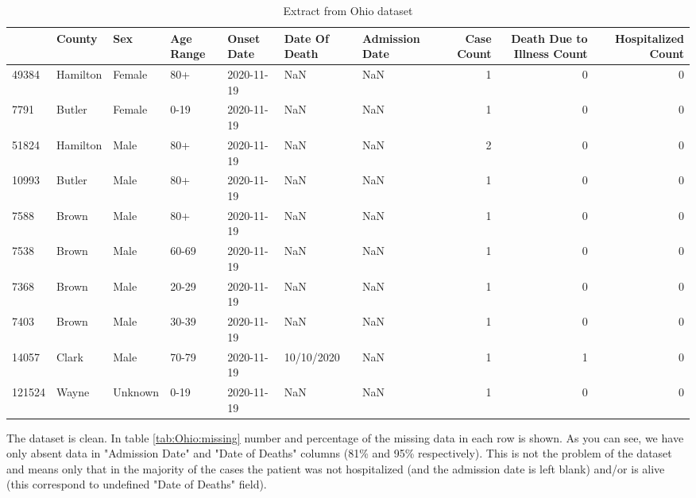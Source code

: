 \documentclass[conference]{IEEEtran}
\begin{document}
\begin{table}
  \tiny
  \centering
  \begin{tabular}{lllllllrrr}
\toprule
{} &    County &      Sex & Age Range & Onset Date & Date Of Death & Admission Date &  Case Count &  Death Due to Illness Count &  Hospitalized Count \\
\midrule
49384  &  Hamilton &   Female &       80+ & 2020-11-19 &           NaN &            NaN &           1 &                           0 &                   0 \\
7791   &    Butler &   Female &      0-19 & 2020-11-19 &           NaN &            NaN &           1 &                           0 &                   0 \\
51824  &  Hamilton &     Male &       80+ & 2020-11-19 &           NaN &            NaN &           2 &                           0 &                   0 \\
10993  &    Butler &     Male &       80+ & 2020-11-19 &           NaN &            NaN &           1 &                           0 &                   0 \\
7588   &     Brown &     Male &       80+ & 2020-11-19 &           NaN &            NaN &           1 &                           0 &                   0 \\
7538   &     Brown &     Male &     60-69 & 2020-11-19 &           NaN &            NaN &           1 &                           0 &                   0 \\
7368   &     Brown &     Male &     20-29 & 2020-11-19 &           NaN &            NaN &           1 &                           0 &                   0 \\
7403   &     Brown &     Male &     30-39 & 2020-11-19 &           NaN &            NaN &           1 &                           0 &                   0 \\
14057  &     Clark &     Male &     70-79 & 2020-11-19 &    10/10/2020 &            NaN &           1 &                           1 &                   0 \\
121524 &     Wayne &  Unknown &      0-19 & 2020-11-19 &           NaN &            NaN &           1 &                           0 &                   0 \\
\bottomrule
\end{tabular}
\caption{Extract from Ohio dataset}
\label{tab:OhioDS}
\end{table}

The dataset is clean. In table \ref{tab:Ohio:missing} number and percentage of the missing data in each row is shown. As you can see, we have only absent data in "Admission Date" and "Date of Deaths" columns (81\% and 95\% respectively). This is not the problem of the dataset and means only that in the majority of the cases the patient was not hospitalized (and the admission date is left blank) and/or is alive (this correspond to undefined "Date of Deaths" field).
\end{document}
